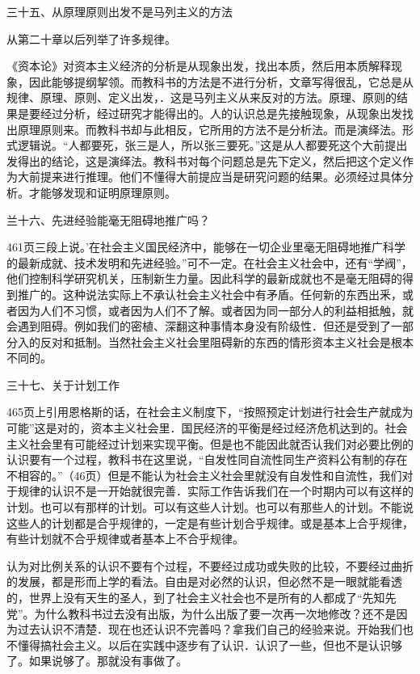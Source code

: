 三十五、从原理原则出发不是马列主义的方法

从第二十章以后列举了许多规律。

《资本论》对资本主义经济的分析是从现象出发，找出本质，然后用本质解释现象，因此能够提纲挈领。而教科书的方法是不进行分析，文章写得很乱，它总是从规律、原理、原则、定义出发，．这是马列主义从来反对的方法。原理、原则的结果是要经过分析，经过研究才能得出的。人的认识总是先接触现象，从现象出发找出原理原则来。而教科书却与此相反，它所用的方法不是分析法。而是演绎法。形式逻辑说。“人都要死，张三是人，所以张三要死。”这是从人都要死这个大前提出发得出的结论，这是演绎法。教科书对每个问题总是先下定义，然后把这个定义作为大前提来进行推理。他们不懂得大前提应当是研究问题的结果。必须经过具体分析。才能够发现和证明原理原则。

兰十六、先进经验能毫无阻碍地推广吗？

461页三段上说。’在社会主义国民经济中，能够在一切企业里毫无阻碍地推广科学的最新成就、技术发明和先进经验。”可不一定。在社会主义社会中，还有“学阀”，他们控制科学研究机关，压制新生力量。因此科学的最新成就也不是毫无阻碍的得到推广的。这种说法实际上不承认社会主义社会中有矛盾。任何新的东西出釆，或者因为人们不习惯，或者因为人们不了解。或者因为同一部分人的利益相抵触，就会遇到阻碍。例如我们的密植、深翻这种事情本身没有阶级性．但还是受到了一部分入的反对和抵制。当然社会主义社会里阻碍新的东西的情形资本主义社会是根本不同的。

三十七、关于计划工作

465页上引用恩格斯的话，在社会主义制度下，“按照预定计划进行社会生产就成为可能”这是对的，资本主义社会里．国民经济的平衡是经过经济危机达到的。社会主义社会里有可能经过计划来实现平衡。但是也不能因此就否认我们对必要比例的认识要有一个过程，教科书在这里说，“自发性同自流性同生产资料公有制的存在不相容的。”（46页）但是不能认为社会主义社会里就没有自发性和自流性，我们对于规律的认识不是一开始就很完善．实际工作告诉我们在一个时期内可以有这样的计划。也可以有那样的计划。可以有这些人计划。也可以有那些人的计划。不能说这些人的计划都是合乎规律的，一定是有些计划合乎规律。或是基本上合乎规律，有些计划就不合乎规律或者基本上不合乎规律。

认为对比例关系的认识不要有个过程，不要经过成功或失败的比较，不要经过曲折的发展，都是形而上学的看法。自由是对必然的认识，但必然不是一眼就能看透的，世界上没有天生的圣人，到了社会主义社会也不是所有的人都成了“先知先党”。为什么教科书过去没有出版，为什么出版了要一次再一次地修改？还不是因为过去认识不清楚．现在也还认识不完善吗？拿我们自己的经验来说。开始我们也不懂得搞社会主义。以后在实践中逐步有了认识．认识了一些，但也不是认识够了。如果说够了。那就没有事做了。

